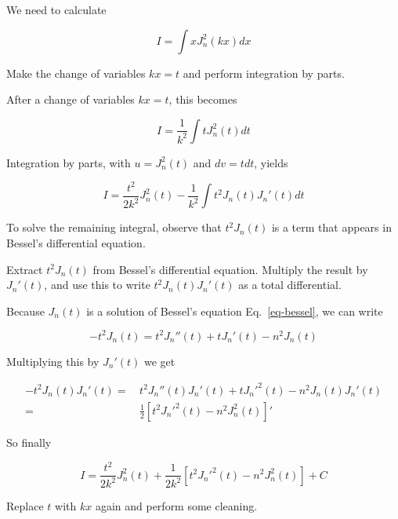 We need to calculate

\begin{equation}
I = \int x J_n^2(k x) dx
\end{equation}

\begin{cue}
Make the change of variables $kx = t$ and perform integration by parts.
\end{cue}

After a change of variables $kx = t$, this becomes

\begin{equation}
I = \frac{1}{k^2} \int t J_n^2(t) dt
\end{equation}

Integration by parts, with $u=J_n^2(t)$ and $dv=t dt$, yields

\begin{equation}
I = \frac{t^2}{2 k^2}J_n^2(t) - \frac{1}{k^2} \int t^2 J_n(t) J_n'(t) dt
\end{equation}

To solve the remaining integral, observe that $t^2 J_n(t)$ is a term that appears in Bessel's differential equation.

\begin{cue}
Extract $t^2 J_n(t)$ from Bessel's differential equation. Multiply the result by $J_n'(t)$, and use this to write $t^2 J_n(t) J_n'(t)$ as a total differential. 
\end{cue}

Because $J_n(t)$ is a solution of Bessel's equation Eq.~\ref{eq-bessel}, we can write

\begin{equation} 
- t^2 J_n(t) = t^2 J_n''(t) + t J_n'(t) - n^2 J_n(t)
\end{equation}

Multiplying this by $J_n'(t)$ we get

\begin{align} 
- t^2 J_n(t) J_n'(t) = &\, t^2 J_n''(t)J_n'(t) + t J_n'^2(t) - n^2 J_n(t)J_n'(t) \nonumber \\
 = &\, \frac{1}{2} \left[{t^2 J_n'^2(t) - n^2 J_n^2(t)}\right]'
\end{align}

So finally

\begin{equation}
I = \frac{t^2}{2 k^2}J_n^2(t) + \frac{1}{2 k^2} \left[{t^2 J_n'^2(t) - n^2 J_n^2(t)}\right] + C
\end{equation} 

\begin{cue}
Replace $t$ with $kx$ again and perform some cleaning.
\end{cue}

